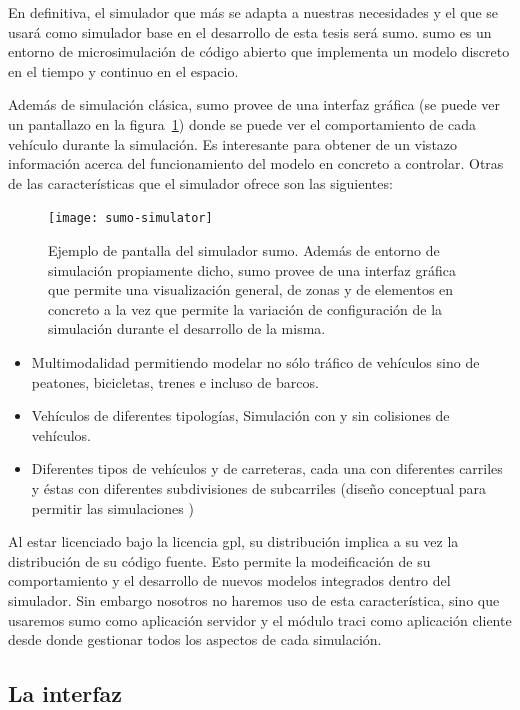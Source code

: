 En definitiva, el simulador que más se adapta a nuestras necesidades y el que se usará como simulador base en el desarrollo de esta tesis será \gls{sumo}. \gls{sumo} es un entorno de microsimulación de código abierto que implementa un modelo discreto en el tiempo y continuo en el espacio.

Además de simulación clásica, \gls{sumo} provee de una interfaz gráfica (se puede ver un pantallazo en la figura~\ref{fig:sumo-simulator}) donde se puede ver el comportamiento de cada vehículo durante la simulación. Es interesante para obtener de un vistazo información acerca del funcionamiento del modelo en concreto a controlar. Otras de las características que el simulador ofrece son las siguientes:

\begin{figure}
	\texttt{[image: sumo-simulator]}
	\caption{Ejemplo de pantalla del simulador \gls{sumo}. Además de entorno de simulación propiamente dicho, \gls{sumo} provee de una interfaz gráfica que permite una visualización general, de zonas y de elementos en concreto a la vez que permite la variación de configuración de la simulación durante el desarrollo de la misma.}
	\label{fig:sumo-simulator}
\end{figure}

\begin{itemize}
	\item Multimodalidad permitiendo modelar no sólo tráfico de vehículos sino de peatones, bicicletas, trenes e incluso de barcos.
	\item Vehículos de diferentes tipologías, Simulación con y sin colisiones de vehículos.
	\item Diferentes tipos de vehículos y de carreteras, cada una con diferentes carriles y éstas con diferentes subdivisiones de subcarriles (diseño conceptual para permitir las simulaciones )
\end{itemize}

Al estar licenciado bajo la licencia \gls{gpl}, su distribución implica a su vez la distribución de su código fuente. Esto permite la modeificación de su comportamiento y el desarrollo de nuevos modelos integrados dentro del simulador. Sin embargo nosotros no haremos uso de esta característica, sino que usaremos \gls{sumo} como aplicación servidor y el módulo \gls{traci} como aplicación cliente desde donde gestionar todos los aspectos de cada simulación.

\subsection{La interfaz }
